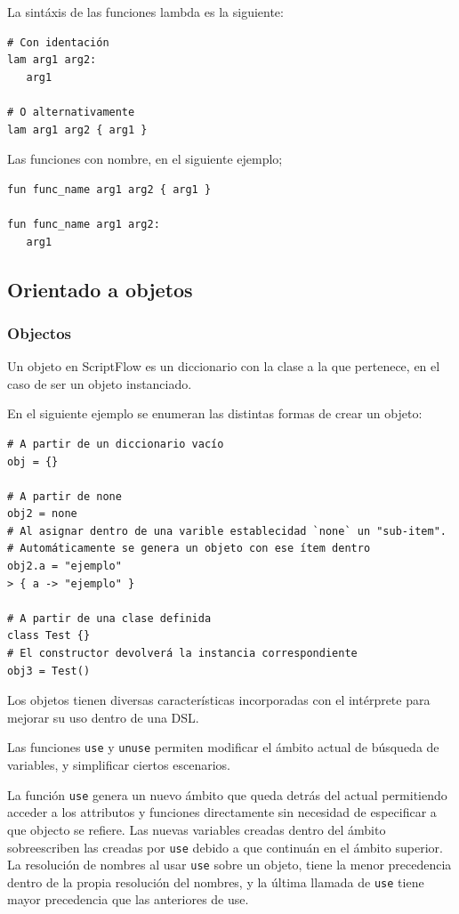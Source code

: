 \documentclass[11pt]{article}
\begin{document}
La sintáxis de las funciones lambda es la siguiente:
\begin{verbatim}
# Con identación
lam arg1 arg2:
   arg1

# O alternativamente
lam arg1 arg2 { arg1 }
\end{verbatim}

Las funciones con nombre, en el siguiente ejemplo;
\begin{verbatim}
fun func_name arg1 arg2 { arg1 }

fun func_name arg1 arg2:
   arg1
\end{verbatim}

\subsection{Orientado a objetos}
\label{sec:org144abeb}

\subsubsection{Objectos}
\label{sec:org3361a83}
Un objeto en ScriptFlow es un diccionario con la clase a la que pertenece, en el caso de ser
un objeto instanciado.

En el siguiente ejemplo se enumeran las distintas formas de crear un objeto:

\begin{verbatim}
# A partir de un diccionario vacío
obj = {}

# A partir de none
obj2 = none
# Al asignar dentro de una varible establecidad `none` un "sub-item".
# Automáticamente se genera un objeto con ese ítem dentro
obj2.a = "ejemplo"
> { a -> "ejemplo" }

# A partir de una clase definida
class Test {}
# El constructor devolverá la instancia correspondiente
obj3 = Test()
\end{verbatim}

Los objetos tienen diversas características incorporadas con el intérprete para mejorar su uso dentro de una DSL.

Las funciones \texttt{use} y \texttt{unuse} permiten modificar el ámbito actual de búsqueda de variables, y simplificar ciertos escenarios.

La función \texttt{use} genera un nuevo ámbito que queda detrás del actual permitiendo acceder a los attributos y funciones directamente
sin necesidad de especificar a que objecto se refiere. Las nuevas variables creadas dentro del ámbito sobreescriben las creadas por \texttt{use}
debido a que continuán en el ámbito superior. La resolución de nombres al usar \texttt{use} sobre un objeto, tiene la menor precedencia
dentro de la propia resolución del nombres, y la última llamada de \texttt{use} tiene mayor precedencia que las anteriores de use.
\end{document}
